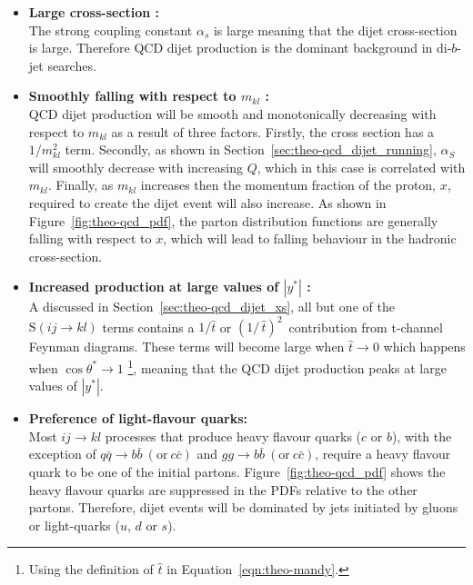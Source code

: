 \begin{itemize}[leftmargin=*]
\item\textbf{Large cross-section :}\\
  The strong coupling constant $\alpha_s$ is large meaning that the dijet cross-section is large.
  Therefore QCD dijet production is the dominant background in di-$b$-jet searches.\vspace{0.5em}
  
\item\textbf{Smoothly falling with respect to $m_{kl}$ :}\\
  QCD dijet production will be smooth and monotonically decreasing
  with respect to $m_{kl}$ as a result of three factors.
  Firstly, the cross section has a $1/m_{kl}^{2}$ term.
  Secondly, as shown in Section~\ref{sec:theo-qcd_dijet_running},
  $\alpha_S$ will smoothly decrease with increasing $Q$, which in this case is correlated with $m_{kl}$.
  Finally, as $m_{kl}$ increases then the momentum fraction of the proton, $x$, required to create
  the dijet event will also increase.
  As shown in Figure~\ref{fig:theo-qcd_pdf}, the parton distribution functions are generally falling 
  with respect to $x$, which will lead to falling behaviour in the hadronic cross-section.
  \vspace{0.5em}
  
\item\textbf{Increased production at large values of $|y^*|$ :}\\
  A discussed in Section~\ref{sec:theo-qcd_dijet_xs}, all but one of the $\text{S}(ij \to kl)$ terms
  contains a $1/\hat{t}$ or $(1/\,\hat{t})^2\,$ contribution from t-channel Feynman diagrams.
  These terms will become large when $\hat{t} \to 0$ which happens when $\cos{\theta^*} \to 1$ \footnote{Using the definition of $\hat{t}$ in Equation~\ref{eqn:theo-mandy}.},
  meaning that the QCD dijet production peaks at large values of $|y^*|$.
  \vspace{0.5em}
  
\item\textbf{Preference of light-flavour quarks:}\\
  Most $ij \to kl$ processes that produce heavy flavour quarks ($c$ or $b$),
  with the exception of $q \bar{q} \to b\bar{b} \ (\text{or}\ c\bar{c})$ and $g g \to b\bar{b} \ (\text{or}\ c\bar{c})$,
  require a heavy flavour quark to be one of the initial partons.
  Figure~\ref{fig:theo-qcd_pdf} shows the heavy flavour quarks are suppressed in the PDFs relative to the other partons.
  Therefore, dijet events will be dominated by jets initiated by gluons or light-quarks ($u$, $d$ or $s$).
 
\end{itemize}

